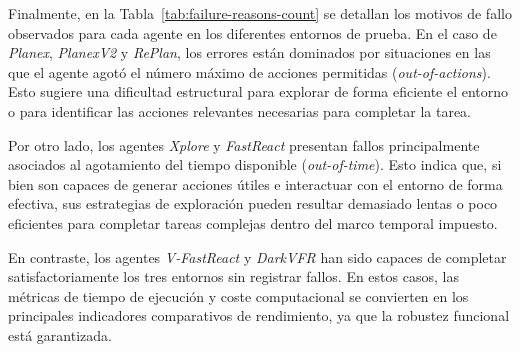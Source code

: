 Finalmente, en la Tabla~\ref{tab:failure-reasons-count} se detallan los motivos
de fallo observados para cada agente en los diferentes entornos de prueba. En el
caso de \emph{Planex}, \emph{PlanexV2} y \emph{RePlan}, los errores están
dominados por situaciones en las que el agente agotó el número máximo de
acciones permitidas (\emph{out-of-actions}). Esto sugiere una dificultad
estructural para explorar de forma eficiente el entorno o para identificar las
acciones relevantes necesarias para completar la tarea.

Por otro lado, los agentes \emph{Xplore} y \emph{FastReact} presentan fallos
principalmente asociados al agotamiento del tiempo disponible
(\emph{out-of-time}). Esto indica que, si bien son capaces de generar acciones
útiles e interactuar con el entorno de forma efectiva, sus estrategias de
exploración pueden resultar demasiado lentas o poco eficientes para completar
tareas complejas dentro del marco temporal impuesto.

En contraste, los agentes \emph{V-FastReact} y \emph{DarkVFR} han sido
capaces de completar satisfactoriamente los tres entornos sin registrar fallos.
En estos casos, las métricas de tiempo de ejecución y coste computacional se
convierten en los principales indicadores comparativos de rendimiento, ya que la
robustez funcional está garantizada.